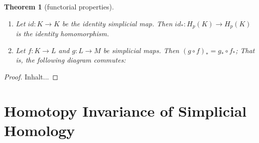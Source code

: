 \documentclass[draft]{scrartcl}
\theoremstyle{plain}
\newtheorem{theorem}{Theorem}[section]
\theoremstyle{definition}
\theoremstyle{remark}
\newcommand{\SH}{Simplicial Homology}
\begin{document}
\begin{theorem}[functorial properties]\mbox{}
	\begin{enumerate}
		\item Let $id: K\to K$ be the identity simplicial map. Then $id_\ast: H_p(K)\to H_p(K)$ is the identity homomorphism.
		\item Let $f:K\to L$ and $g: L\to M$ be simplicial maps. Then $(g\circ f)_\ast=g_\ast\circ f_\ast$; That is, the following diagram commutes:
		
		\begin{center}
			
	\end{center}
	\end{enumerate}
\end{theorem}

\begin{proof}
	Inhalt...
\end{proof}

\section{Homotopy Invariance of \SH}

\printbibliography
\end{document}
